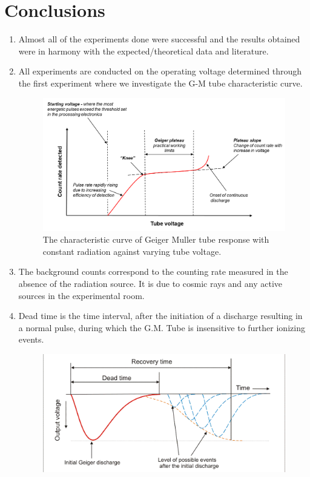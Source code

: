 \documentclass[%
 reprint,
nofootinbib,
 amsmath,amssymb,
 aps,
floatfix,
]{revtex4-2}
\begin{document}
\section{Conclusions}
\begin{enumerate}
    \item Almost all of the experiments done were successful and the results obtained were in harmony with the expected/theoretical data and literature.
    \item All experiments are conducted on the operating voltage determined through the first experiment where we investigate the G-M tube characteristic curve.
    \begin{figure}
        \centering
        \includegraphics[scale = 0.38]{Figures/Geiger_plateau_curve.png}
        \caption{The characteristic curve of Geiger Muller tube response with constant radiation against varying tube voltage.}
        \label{fig:disc-1}
    \end{figure}
    \item The background counts correspond to  the counting rate measured in the absence of the radiation source. It is due to cosmic rays and any active sources in the experimental room.
    \item Dead time is the time interval, after the initiation of a discharge resulting in a normal pulse, during which the G.M. Tube is insensitive to further ionizing events.
    \begin{figure}
        \centering
        \includegraphics[scale = 0.29]{Figures/Dead_time_of_geiger_muller_tube.png}

\end{figure}
\end{enumerate}
\end{document}
